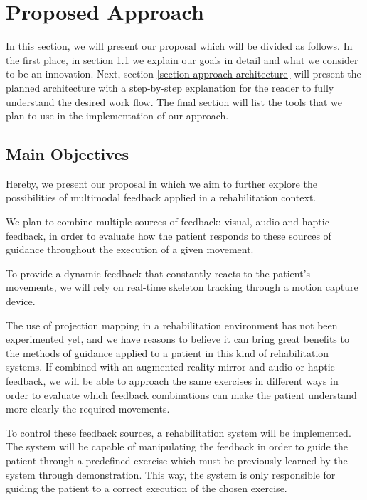 \documentclass[runningheads]{llncs}
\begin{document}
\raggedbottom
\section{Proposed Approach}
\label{section-approach}

In this section, we will present our proposal which will be divided as follows. 
In the first place, in section \ref{section-approach-main-objectives} we explain
our goals in detail and what we consider to be an innovation. 
Next, section \ref{section-approach-architecture} will present the planned architecture with a step-by-step 
explanation for the reader to fully understand the desired work flow.
The final section will list the tools that we plan to use in the implementation of our approach.

\subsection{Main Objectives}
\label{section-approach-main-objectives}

Hereby, we present our proposal in which we aim to further explore the possibilities of multimodal 
feedback applied in a rehabilitation context.

We plan to combine multiple sources of feedback: visual, audio and haptic feedback, 
in order to evaluate how the patient responds to these sources of 
guidance throughout the execution of a given movement. 

To provide a dynamic feedback that constantly reacts to the patient's movements, we will rely on real-time skeleton tracking through a motion capture device.

The use of projection mapping in a rehabilitation environment has not been experimented yet, 
and we have reasons to believe it can bring great benefits to the methods of guidance 
applied to a patient in this kind of rehabilitation systems. If combined with an augmented reality mirror 
and audio or haptic feedback, we will be able to approach the same exercises in different ways in order to evaluate which 
feedback combinations can make the patient understand more clearly the required movements.

To control these feedback sources, a rehabilitation system will be implemented.%
The system will be capable of manipulating the feedback in order to guide
the patient through a predefined exercise which must be previously learned by the system through demonstration.
This way, the system is only responsible for guiding the patient to a correct execution of the chosen exercise.
\end{document}
